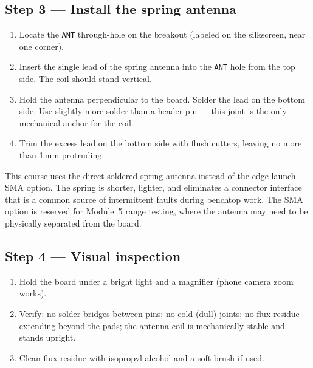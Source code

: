 \documentclass[11pt,letterpaper]{article}
\begin{document}

\newpage
\subsection{Step 3 --- Install the spring antenna}
\begin{enumerate}[leftmargin=2em]
	\item Locate the \texttt{ANT} through-hole on the breakout (labeled on the silkscreen, near one corner).
	\item Insert the single lead of the spring antenna into the \texttt{ANT} hole from the top side. The coil should stand vertical.
	\item Hold the antenna perpendicular to the board. Solder the lead on the bottom side. Use slightly more solder than a header pin --- this joint is the only mechanical anchor for the coil.
	\item Trim the excess lead on the bottom side with flush cutters, leaving no more than 1\,mm protruding.
\end{enumerate}

\begin{tcolorbox}[infobox={Why the spring, not the SMA?}]
	This course uses the direct-soldered spring antenna instead of the edge-launch \mbox{SMA} option. The spring is shorter, lighter, and eliminates a connector interface that is a common source of intermittent faults during benchtop work. The \mbox{SMA} option is reserved for Module~5 range testing, where the antenna may need to be physically separated from the board.
\end{tcolorbox}


\subsection{Step 4 --- Visual inspection}
\begin{enumerate}[leftmargin=2em]
	\item Hold the board under a bright light and a magnifier (phone camera zoom works).
	\item Verify: no solder bridges between pins; no cold (dull) joints; no flux residue extending beyond the pads; the antenna coil is mechanically stable and stands upright.
	\item Clean flux residue with isopropyl alcohol and a soft brush if used.
\end{enumerate}
\end{document}
